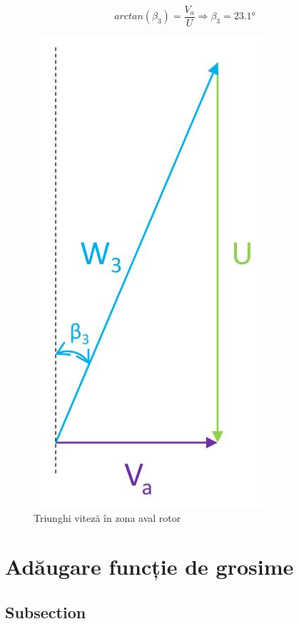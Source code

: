 \begin{equation}
arctan(\beta_{3})=\frac{V_{a}}{U} \Rightarrow \beta_{3} =23.1\si{\degree}
\end{equation}

\begin{figure}[h!]
	\centering
	\includegraphics[scale=0.5]{figures/triunghi_viteza_ZAR.jpg}
	\caption{Triunghi viteză în zona aval rotor}
	\label{Triunghi viteză în zona aval rotor}
\end{figure}

\clearpage


\section{Adăugare funcție de grosime}

\subsection{Subsection}